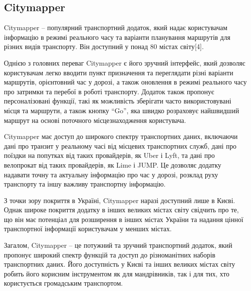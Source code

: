 \subsection{Citymapper}
\label{subsec:citymapper-subsection}

Citymapper -- популярний транспортний додаток, який надає користувачам інформацію в режимі реального часу та варіанти планування маршрутів для різних видів транспорту. Він доступний у понад 80 містах світу[4].

Однією з головних переваг Citymapper є його зручний інтерфейс, який дозволяє користувачам легко вводити пункт призначення та переглядати різні варіанти маршрутів, орієнтовний час у дорозі, а також оновлення в режимі реального часу про затримки та перебої в роботі транспорту. Додаток також пропонує персоналізовані функції, такі як можливість зберігати часто використовувані місця та маршрути, а також кнопку ``Go'', яка швидко розраховує найшвидший маршрут на основі поточного місцезнаходження користувача.

Citymapper має доступ до широкого спектру транспортних даних, включаючи дані про транзит у реальному часі від місцевих транспортних служб, дані про поїздки на попутках від таких провайдерів, як Uber і Lyft, та дані про велопрокат від таких провайдерів, як Lime і JUMP. Це дозволяє додатку надавати точну та актуальну інформацію про час у дорозі, розклад руху транспорту та іншу важливу транспортну інформацію.

З точки зору покриття в Україні, Citymapper наразі доступний лише в Києві. Однак широке покриття додатку в інших великих містах світу свідчить про те, що він має потенціал для розширення в інших містах України та надання цінної транспортної інформації користувачам у менших містах.

Загалом, Citymapper -- це потужний та зручний транспортний додаток, який пропонує широкий спектр функцій та доступ до різноманітних наборів транспортних даних. Його доступність у Києві та інших великих містах світу робить його корисним інструментом як для мандрівників, так і для тих, хто користується громадським транспортом.